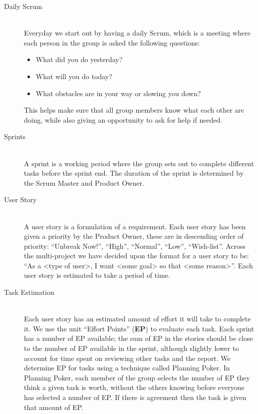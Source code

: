 \begin{description}
	\item[Daily Scrum] \hfill \\
	Everyday we start out by having a daily Scrum, which is a meeting where each person in the group is asked the following questions:
		\begin{itemize}
		    \item What did you do yesterday? 
			\item What will you do today?
			\item What obstacles are in your way or slowing you down?		
		\end{itemize}
		This helps make sure that all group members know what each other are doing, while also giving an opportunity to ask for help if needed.
	\item[Sprints] \hfill \\
	A sprint is a working period where the group sets out to complete different tasks before the sprint end. 
	The duration of the sprint is determined by the Scrum Master and Product Owner. 
	\item[User Story] \hfill \\
	A user story is a formulation of a requirement. 
	Each user story has been given a priority by the Product Owner, these are in descending order of priority: ``Unbreak Now!'', ``High'', ``Normal'', ``Low'', ``Wish-list''. 
	Across the multi-project we have decided upon the format for a user story to be: ``As a <type of user>, I want <some goal> so that <some reason>''.
	Each user story is estimated to take a period of time.
	\item[Task Estimation] \hfill \\
	Each user story has an estimated amount of effort it will take to complete it. 
	We use the unit ``Effort Points'' (\textbf{EP}) to evaluate each task.
	Each sprint has a number of EP available; the sum of EP in the stories should be close to the number of EP available in the sprint, although slightly lower to account for time spent on reviewing other tasks and the report. 
	We determine EP for tasks using a technique called Planning Poker.
	In Planning Poker, each member of the group selects the number of EP they think a given task is worth, without the others knowing before everyone has selected a number of EP.
	If there is agreement then the task is given that amount of EP.

\end{description}
